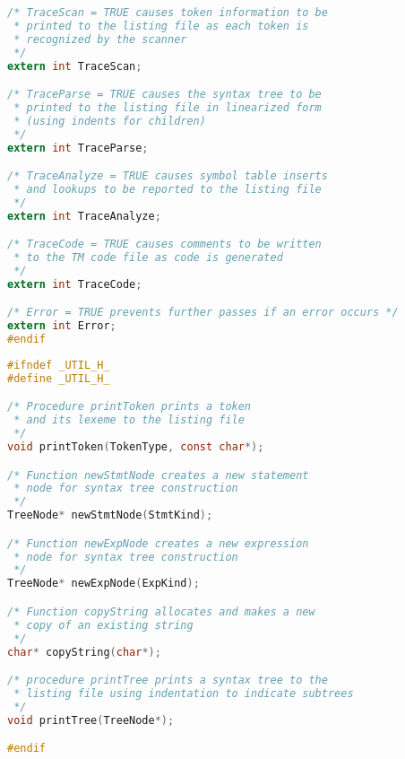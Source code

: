 \documentclass[lang=cn,10pt]{elegantbook}
\begin{document}
\begin{lstlisting}[caption={globals.h},language=c]
/* TraceScan = TRUE causes token information to be
 * printed to the listing file as each token is
 * recognized by the scanner
 */
extern int TraceScan;

/* TraceParse = TRUE causes the syntax tree to be
 * printed to the listing file in linearized form
 * (using indents for children)
 */
extern int TraceParse;

/* TraceAnalyze = TRUE causes symbol table inserts
 * and lookups to be reported to the listing file
 */
extern int TraceAnalyze;

/* TraceCode = TRUE causes comments to be written
 * to the TM code file as code is generated
 */
extern int TraceCode;

/* Error = TRUE prevents further passes if an error occurs */
extern int Error; 
#endif
\end{lstlisting}

\begin{lstlisting}[caption={util.h},language=c]
#ifndef _UTIL_H_
#define _UTIL_H_

/* Procedure printToken prints a token 
 * and its lexeme to the listing file
 */
void printToken(TokenType, const char*);

/* Function newStmtNode creates a new statement
 * node for syntax tree construction
 */
TreeNode* newStmtNode(StmtKind);

/* Function newExpNode creates a new expression 
 * node for syntax tree construction
 */
TreeNode* newExpNode(ExpKind);

/* Function copyString allocates and makes a new
 * copy of an existing string
 */
char* copyString(char*);

/* procedure printTree prints a syntax tree to the 
 * listing file using indentation to indicate subtrees
 */
void printTree(TreeNode*);

#endif
\end{lstlisting}
\end{document}
